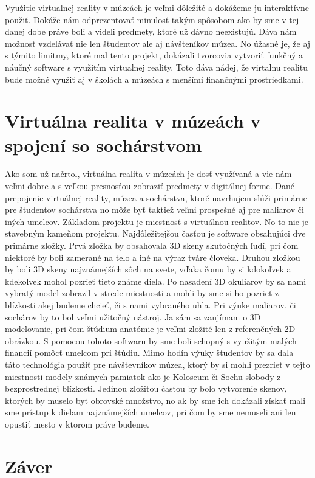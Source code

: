 \documentclass[10pt,twoside,slovak,a4paper]{article}
\begin{document}
Využitie virtualnej reality v múzeách je veľmi dôležité a dokážeme ju interaktívne použiť. Dokáže nám odprezentovať minulosť takým spôsobom ako by sme v tej danej dobe práve boli a videli predmety, ktoré už dávno neexistujú.  Dáva nám možnosť vzdelávať nie len študentov ale aj návšteníkov múzea. No úžasné je, že aj s týmito limitmy, ktoré mal tento projekt, dokázali tvorcovia vytvoriť funkčný a náučný software s využitím virtualnej reality. Toto dáva nádej, že virtalnu realitu bude možné využiť aj v školách a múzeách s menšími finančnými prostriedkami.

\section{Virtuálna realita v múzeách v spojení so sochárstvom} \label{produkt}

Ako som už načrtol, virtuálna realita v múzeách je dosť využívaná a vie nám veľmi dobre a s veľkou presnosťou zobraziť predmety v digitálnej forme. Dané prepojenie virtuálnej reality, múzea a sochárstva, ktoré navrhujem slúži primárne pre študentov sochárstva no môže byť taktiež veľmi prospešné aj pre maliarov či iných umelcov. Základom projektu je miestnosť s virtuálnou realitov. No to nie je stavebným kameňom projektu. Najdôležitejšou časťou je software obsahujúci dve primárne zložky. Prvá zložka by obsahovala 3D skeny skutočných ľudí, pri čom niektoré by boli zamerané na telo a iné na výraz tváre človeka. Druhou zložkou by boli 3D skeny najznámejších sôch na svete, vďaka čomu by si kdokoľvek a kdekoľvek mohol pozrieť tieto známe diela. Po nasadení 3D okuliarov by sa nami vybratý model zobrazil v strede miestnosti a mohli by sme si ho pozrieť z blízkosti akej budeme chcieť, či s nami vybraného uhla. Pri výuke maliarov, či sochárov by to bol veľmi užitočný nástroj. Ja sám sa zaujímam o 3D modelovanie, pri čom štúdium anatómie je veľmi zložité len z referenčných 2D obrázkou. S pomocou tohoto softwaru by sme boli schopný s využitým malých financií pomôcť umelcom pri štúdiu. Mimo hodín výuky študentov by sa dala táto technológia použiť pre návštevníkov múzea, ktorý by si mohli prezrieť v tejto miestnosti modely známych pamiatok ako je Koloseum či Sochu slobody z bezprostrednej blízkosti. Jedinou zložitou časťou by bolo vytvorenie skenov, ktorých by muselo byť obrovské množstvo, no ak by sme ich dokázali získať mali sme prístup k dielam najznámejších umelcov, pri čom by sme nemuseli ani len opustiť mesto v ktorom práve budeme. 

\section{Záver} \label{zaver} %






\end{document}
